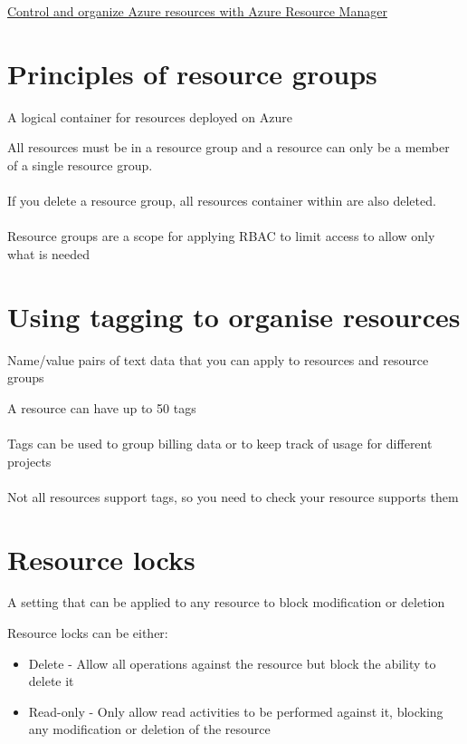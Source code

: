 \documentclass{article}[18pt]
\begin{document}
\begin{center}
\underline{\LARGE Control and organize Azure resources with Azure Resource Manager}
\end{center}

\section{Principles of resource groups}
\begin{definition}
	A logical container for resources deployed on Azure
\end{definition}
All resources must be in a resource group and a resource can only be a member of a single resource group.\\
\\
If you delete a resource group, all resources container within are also deleted.\\
\\
Resource groups are a scope for applying RBAC to limit access to allow only what is needed
\section{Using tagging to organise resources}
\begin{definition}[Tags]
	Name/value pairs of text data that you can apply to resources and resource groups
\end{definition}
A resource can have up to 50 tags\\
\\
Tags can be used to group billing data or to keep track of usage for different projects\\
\\
Not all resources support tags, so you need to check your resource supports them
\section{Resource locks}
\begin{definition}
	A setting that can be applied to any resource to block modification or deletion
\end{definition}
Resource locks can be either:
\begin{itemize}
	\item Delete - Allow all operations against the resource but block the ability to delete it
	\item Read-only - Only allow read activities to be performed against it, blocking any modification or deletion of the resource
\end{itemize}
\end{document}
